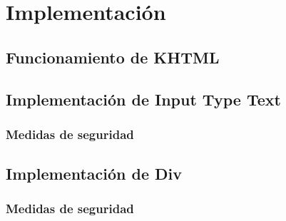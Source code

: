 \chapter{Implementación}\label{implementacion}
\section{Funcionamiento de KHTML}\label{khtml}
\section{Implementación de Input Type Text}\label{input}
\subsection{Medidas de seguridad}\label{input_security}
\section{Implementación de Div}\label{div}
\subsection{Medidas de seguridad}\label{div_security}
